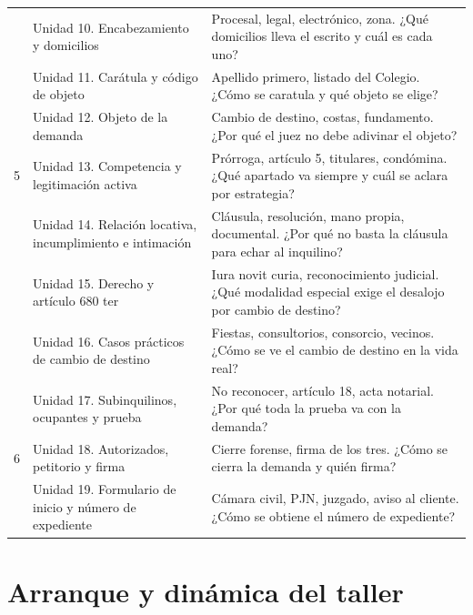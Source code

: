 \documentclass[12pt,oneside]{book}
\begin{document}
\begin{longtable}{>{\raggedright\arraybackslash}p{} >{\raggedright\arraybackslash}p{} >{\RaggedRight\arraybackslash}p{}}
\addlinespace
4 & Unidad 10. Encabezamiento y domicilios & Procesal, legal, electrónico, zona. ¿Qué domicilios lleva el escrito y cuál es cada uno? \\
\addlinespace
4 & Unidad 11. Carátula y código de objeto & Apellido primero, listado del Colegio. ¿Cómo se caratula y qué objeto se elige? \\
\addlinespace
4 & Unidad 12. Objeto de la demanda & Cambio de destino, costas, fundamento. ¿Por qué el juez no debe adivinar el objeto? \\
\addlinespace
\cmidrule{1-3}
5 & Unidad 13. Competencia y legitimación activa & Prórroga, artículo 5, titulares, condómina. ¿Qué apartado va siempre y cuál se aclara por estrategia? \\
\addlinespace
5 & Unidad 14. Relación locativa, incumplimiento e intimación & Cláusula, resolución, mano propia, documental. ¿Por qué no basta la cláusula para echar al inquilino? \\
\addlinespace
5 & Unidad 15. Derecho y artículo 680 ter & Iura novit curia, reconocimiento judicial. ¿Qué modalidad especial exige el desalojo por cambio de destino? \\
\addlinespace
5 & Unidad 16. Casos prácticos de cambio de destino & Fiestas, consultorios, consorcio, vecinos. ¿Cómo se ve el cambio de destino en la vida real? \\
\addlinespace
5 & Unidad 17. Subinquilinos, ocupantes y prueba & No reconocer, artículo 18, acta notarial. ¿Por qué toda la prueba va con la demanda? \\
\addlinespace
\cmidrule{1-3}
6 & Unidad 18. Autorizados, petitorio y firma & Cierre forense, firma de los tres. ¿Cómo se cierra la demanda y quién firma? \\
\addlinespace
6 & Unidad 19. Formulario de inicio y número de expediente & Cámara civil, PJN, juzgado, aviso al cliente. ¿Cómo se obtiene el número de expediente? \\
\bottomrule
\end{longtable}

\clearpage

\chapter{Arranque y dinámica del taller}
\end{document}
